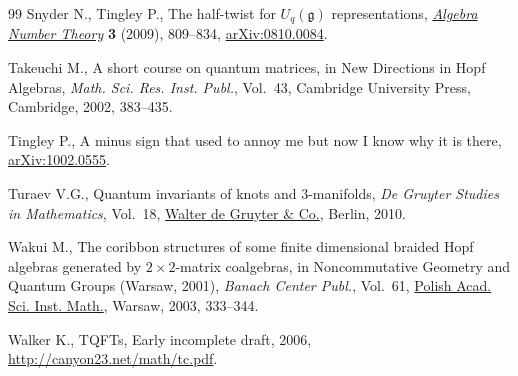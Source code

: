 \documentclass[pdftex]{sigma}%
\numberwithin{equation}{section}
\begin{document}
\begin{thebibliography}{99}
Snyder N., Tingley P., The half-twist for {$U_q({\mathfrak g})$}
 representations, \href{https://doi.org/10.2140/ant.2009.3.809}{\textit{Algebra Number Theory}} \textbf{3} (2009), 809--834,
 \href{http://arxiv.org/abs/0810.0084}{arXiv:0810.0084}.

Takeuchi M., A short course on quantum matrices, in New Directions in {H}opf
 Algebras, \textit{Math. Sci. Res. Inst. Publ.}, Vol.~43, Cambridge University
 Press, Cambridge, 2002, 383--435.

Tingley P., A minus sign that used to annoy me but now I know why it is there,
 \href{http://arxiv.org/abs/1002.0555}{arXiv:1002.0555}.

Turaev V.G., Quantum invariants of knots and 3-manifolds, \textit{De Gruyter
 Studies in Mathematics}, Vol.~18, \href{https://doi.org/10.1515/9783110221848}{Walter de Gruyter \& Co.}, Berlin, 2010.

Wakui M., The coribbon structures of some finite dimensional braided {H}opf
 algebras generated by {$2\times 2$}-matrix coalgebras, in Noncommutative
 Geometry and Quantum Groups ({W}arsaw, 2001), \textit{Banach Center Publ.},
 Vol.~61, \href{https://doi.org/10.4064/bc61-0-20}{Polish Acad. Sci. Inst. Math.}, Warsaw, 2003, 333--344.

Walker K., {TQFT}s, {E}arly incomplete draft, 2006,
 \url{http://canyon23.net/math/tc.pdf}.

\end{thebibliography}\LastPageEnding
\end{document}
